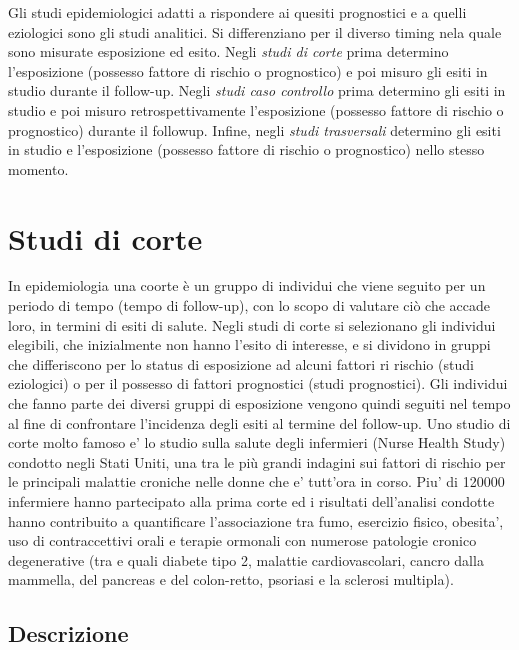 \documentclass[]{book}
\begin{document}
Gli studi epidemiologici adatti a rispondere ai quesiti prognostici e a quelli eziologici sono gli studi analitici. Si differenziano per il diverso timing nela quale sono misurate esposizione ed esito. Negli \emph{studi di corte} prima determino l'esposizione (possesso fattore di rischio o prognostico) e poi misuro gli esiti in studio durante il follow-up. Negli \emph{studi caso controllo} prima determino gli esiti in studio e poi misuro retrospettivamente l'esposizione (possesso fattore di rischio o prognostico) durante il followup. Infine, negli \emph{studi trasversali} determino gli esiti in studio e l'esposizione (possesso fattore di rischio o prognostico) nello stesso momento.

\hypertarget{studi-di-corte}{%
\section{Studi di corte}\label{studi-di-corte}}

In epidemiologia una coorte è un gruppo di individui che viene seguito per un periodo di tempo (tempo di follow-up), con lo scopo di valutare ciò che accade loro, in termini di esiti di salute. Negli studi di corte si selezionano gli individui elegibili, che inizialmente non hanno l'esito di interesse, e si dividono in gruppi che differiscono per lo status di esposizione ad alcuni fattori ri rischio (studi eziologici) o per il possesso di fattori prognostici (studi prognostici). Gli individui che fanno parte dei diversi gruppi di esposizione vengono quindi seguiti nel tempo al fine di confrontare l'incidenza degli esiti al termine del follow-up.
Uno studio di corte molto famoso e' lo studio sulla salute degli infermieri (Nurse Health Study) condotto negli Stati Uniti, una tra le più grandi indagini sui fattori di rischio per le principali malattie croniche nelle donne che e' tutt'ora in corso. Piu' di 120000 infermiere hanno partecipato alla prima corte ed i risultati dell'analisi condotte hanno contribuito a quantificare l'associazione tra fumo, esercizio fisico, obesita', uso di contraccettivi orali e terapie ormonali con numerose patologie cronico degenerative (tra e quali diabete tipo 2, malattie cardiovascolari, cancro dalla mammella, del pancreas e del colon-retto, psoriasi e la sclerosi multipla).

\hypertarget{descrizione-1}{%
\subsection{Descrizione}\label{descrizione-1}}
\end{document}
